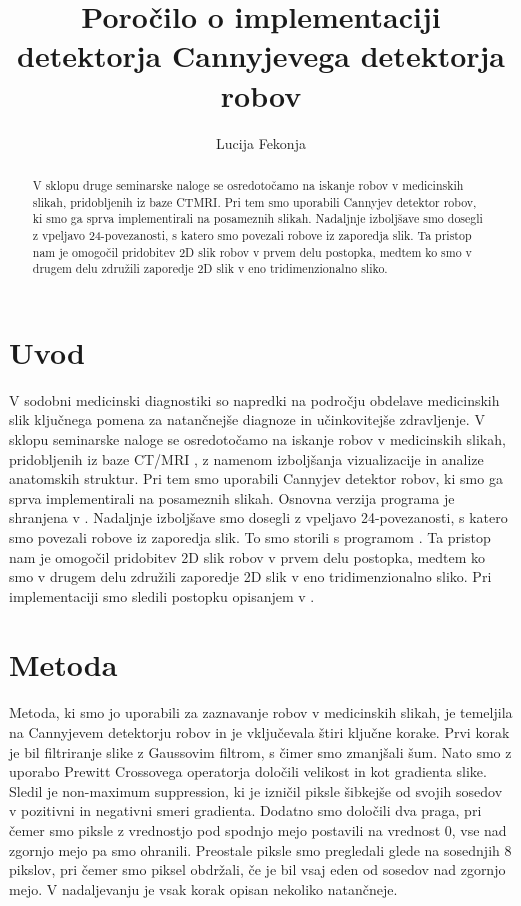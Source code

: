 \documentclass{article}
\author{Lucija Fekonja}
\title{Poročilo o implementaciji detektorja Cannyjevega detektorja robov}
\begin{document}

    \maketitle

    \begin{abstract}
        V sklopu druge seminarske naloge se osredotočamo na iskanje robov v medicinskih slikah, pridobljenih iz baze CTMRI.
        Pri tem smo uporabili Cannyjev detektor robov, ki smo ga sprva implementirali na posameznih slikah. Nadaljnje 
        izboljšave smo dosegli z vpeljavo 24-povezanosti, s katero smo povezali robove iz zaporedja slik. Ta pristop nam 
        je omogočil pridobitev 2D slik robov v prvem delu postopka, medtem ko smo v drugem delu združili zaporedje 2D slik 
        v eno tridimenzionalno sliko.
    \end{abstract}

    \section{Uvod}
    V sodobni medicinski diagnostiki so napredki na področju obdelave medicinskih slik ključnega 
    pomena za natančnejše diagnoze in učinkovitejše zdravljenje. V sklopu seminarske naloge se osredotočamo 
    na iskanje robov v medicinskih slikah, pridobljenih iz baze CT/MRI \cite{CTMRI}, z namenom izboljšanja vizualizacije 
    in analize anatomskih struktur. Pri tem smo uporabili Cannyjev detektor robov, ki smo ga sprva implementirali 
    na posameznih slikah. Osnovna verzija programa je shranjena v . Nadaljnje izboljšave smo dosegli 
    z vpeljavo 24-povezanosti, s katero smo povezali robove iz zaporedja slik. To smo storili s programom 
    . Ta pristop nam je omogočil pridobitev 2D slik robov v prvem delu postopka, medtem ko smo v 
    drugem delu združili zaporedje 2D slik v eno tridimenzionalno sliko. Pri implementaciji smo sledili postopku opisanjem v \cite{wiki}.

    \section{Metoda}
    Metoda, ki smo jo uporabili za zaznavanje robov v medicinskih slikah, je temeljila na Cannyjevem detektorju robov 
    in je vključevala štiri ključne korake. Prvi korak je bil filtriranje slike z Gaussovim filtrom, s čimer smo zmanjšali šum.
    Nato smo z uporabo Prewitt Crossovega operatorja določili velikost in kot gradienta slike. Sledil je non-maximum suppression,
    ki je izničil piksle šibkejše od svojih sosedov v pozitivni in negativni smeri gradienta. Dodatno smo določili dva praga, 
    pri čemer smo piksle z vrednostjo pod spodnjo mejo postavili na vrednost 0, vse nad zgornjo mejo pa smo ohranili. 
    Preostale piksle smo pregledali glede na sosednjih 8 pikslov, pri čemer smo piksel obdržali, če je bil vsaj eden od sosedov 
    nad zgornjo mejo. V nadaljevanju je vsak korak opisan nekoliko natančneje.
\end{document}
